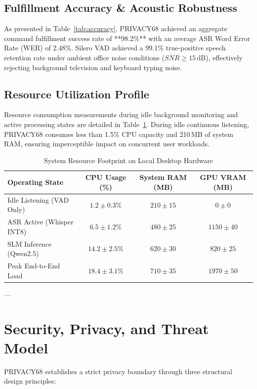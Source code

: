 \documentclass[conference]{IEEEtran}
\begin{document}
\subsection{Fulfillment Accuracy & Acoustic Robustness}
As presented in Table~\ref{tab:accuracy}, PRIVACY68 achieved an aggregate command fulfillment success rate of **98.2\%** with an average ASR Word Error Rate (WER) of 2.48\%. Silero VAD achieved a 99.1\% true-positive speech retention rate under ambient office noise conditions ($SNR \ge 15\,\text{dB}$), effectively rejecting background television and keyboard typing noise.

\subsection{Resource Utilization Profile}
Resource consumption measurements during idle background monitoring and active processing states are detailed in Table~\ref{tab:resource}. During idle continuous listening, PRIVACY68 consumes less than 1.5\% CPU capacity and 210\,MB of system RAM, ensuring imperceptible impact on concurrent user workloads.

\begin{table}[htbp]
\caption{System Resource Footprint on Local Desktop Hardware}
\label{tab:resource}
\centering
\begin{tabular}{@{}lccc@{}}
\toprule
\textbf{Operating State} & \textbf{CPU Usage (\%)} & \textbf{System RAM (MB)} & \textbf{GPU VRAM (MB)} \\
\midrule
Idle Listening (VAD Only) & $1.2 \pm 0.3\%$ & $210 \pm 15$ & $0 \pm 0$ \\
ASR Active (Whisper INT8) & $6.5 \pm 1.2\%$ & $480 \pm 25$ & $1150 \pm 40$ \\
SLM Inference (Qwen2.5) & $14.2 \pm 2.5\%$ & $620 \pm 30$ & $820 \pm 25$ \\
Peak End-to-End Load & $18.4 \pm 3.1\%$ & $710 \pm 35$ & $1970 \pm 50$ \\
\bottomrule
\end{tabular}
\end{table}

---

\section{Security, Privacy, and Threat Model}
PRIVACY68 establishes a strict privacy boundary through three structural design principles:
\end{document}
